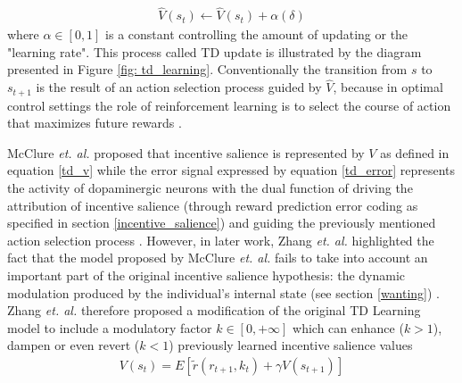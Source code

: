 \begin{align}
    \label{td_update}
    \widehat{V}(s_t)  \leftarrow \widehat{V}(s_t) + \alpha(\delta)
\end{align}
where $\alpha \in [0, 1]$ is a constant controlling the amount of updating or the "learning rate". This process called TD update is illustrated by the diagram presented in Figure \ref{fig: td_learning}. Conventionally the transition from $s$ to $s_{t+1}$ is the result of an action selection process guided by $\widehat{V}$, because in optimal control settings the role of reinforcement learning is to select the course of action that maximizes future rewards \cite{schultz1997neural,mcclure2003computational,sutton2018reinforcement}.

McClure \textit{et. al.} proposed that incentive salience is represented by $V$ as defined in equation \ref{td_v} while the error signal expressed by equation \ref{td_error} represents the activity of dopaminergic neurons with the dual function of driving the attribution of incentive salience (through reward prediction error coding as specified in section \ref{incentive_salience}) and guiding the previously mentioned action selection process \cite{schultz1997neural,mcclure2003computational,o2003temporal}. However, in later work, Zhang \textit{et. al.} highlighted the fact that the model proposed by McClure \textit{et. al.} fails to take into account an important part of the original incentive salience hypothesis: the dynamic modulation produced by the individual's internal state (see section \ref{wanting}) \cite{toates1994comparing,mcclure2003computational,berridge2004motivation,zhang2009neural,tindell2009dynamic,berridge2012prediction}. Zhang \textit{et. al.} therefore proposed a modification of the original TD Learning model to include a modulatory factor $k \in [0, +\infty]$ which can enhance ($k > 1$), dampen or even revert ($k < 1$) previously learned incentive salience values
\begin{align}
    \label{zhang_td_v}
    V(s_t) = E[\tilde{r}(r_{t+1},k_{t}) + \gamma V(s_{t+1})]
\end{align}
